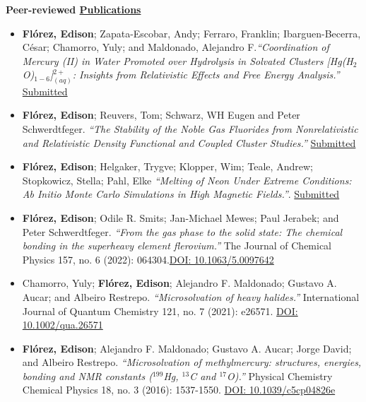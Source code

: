 {\bf\Large Peer-reviewed \href{.}{Publications}}

\begin{itemize}
    \small

    \item \textbf{Flórez, Edison}; Zapata-Escobar, Andy; Ferraro, Franklin; Ibarguen-Becerra, César; Chamorro, Yuly; and Maldonado, Alejandro F.\emph{``Coordination of Mercury (II) in Water Promoted over Hydrolysis in Solvated Clusters [Hg(H$_2$O)$_{1-6}$]$^{2+}_{(aq)}$: Insights from Relativistic Effects and Free Energy Analysis.''} \underline{Submitted}

    \item \textbf{Flórez, Edison}; Reuvers, Tom; Schwarz, WH Eugen and Peter Schwerdtfeger. \emph{``The Stability of the Noble Gas Fluorides from Nonrelativistic and Relativistic Density Functional and Coupled Cluster Studies.''} \underline{Submitted}

    \item \textbf{Flórez, Edison}; Helgaker, Trygve; Klopper, Wim; Teale, Andrew; Stopkowicz, Stella; Pahl, Elke \emph{``Melting of Neon Under Extreme Conditions: Ab Initio Monte Carlo Simulations in High Magnetic Fields.''}. \underline{Submitted}

    \item \textbf{Flórez, Edison}; Odile R. Smits; Jan-Michael Mewes; Paul Jerabek; and Peter Schwerdtfeger. \emph{``From the gas phase to the solid state: The chemical bonding in the superheavy element flerovium.''} The Journal of Chemical Physics 157, no. 6 (2022): 064304.\underline{DOI: 10.1063/5.0097642}

    \item Chamorro, Yuly;  \textbf{Flórez, Edison}; Alejandro F. Maldonado; Gustavo A. Aucar; and Albeiro Restrepo. \emph{``Microsolvation of heavy halides.''} International Journal of Quantum Chemistry 121, no. 7 (2021): e26571. \underline{DOI: 10.1002/qua.26571}

    \item \textbf{Flórez, Edison}; Alejandro F. Maldonado; Gustavo A. Aucar; Jorge David; and Albeiro Restrepo. \emph{``Microsolvation of methylmercury: structures, energies, bonding and NMR constants ($^{199}$Hg, $^{13}$C and $^{17}$O).''} Physical Chemistry Chemical Physics 18, no. 3 (2016): 1537-1550. \underline{DOI: 10.1039/c5cp04826e}

\end{itemize}


